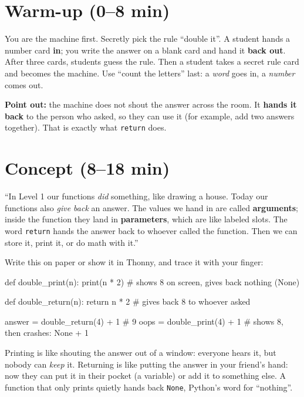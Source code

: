 \section{Warm-up (0--8 min)}
\begin{unplugged}
You are the machine first. Secretly pick the rule \enquote{double it}. A student hands a number card \textbf{in};
you write the answer on a blank card and hand it \textbf{back out}. After three cards, students guess the rule.
Then a student takes a secret rule card and becomes the machine. Use \enquote{count the letters} last: a \emph{word} goes in, a \emph{number} comes out.
\par\textbf{Point out:} the machine does not shout the answer across the room. It \textbf{hands it back} to the person who asked,
so they can use it (for example, add two answers together). That is exactly what \texttt{return} does.
\end{unplugged}

\section{Concept (8--18 min)}
\begin{teacherscript}[Say]
\enquote{In Level 1 our functions \emph{did} something, like drawing a house. Today our functions also \emph{give back} an answer.
The values we hand in are called \textbf{arguments}; inside the function they land in \textbf{parameters}, which are like labeled slots.
The word \texttt{return} hands the answer back to whoever called the function. Then we can store it, print it, or do math with it.}
\end{teacherscript}
Write this on paper or show it in Thonny, and trace it with your finger:
\begin{pycode}
def double_print(n):
    print(n * 2)          # shows 8 on screen, gives back nothing (None)

def double_return(n):
    return n * 2          # gives back 8 to whoever asked

answer = double_return(4) + 1   # 9
oops = double_print(4) + 1      # shows 8, then crashes: None + 1
\end{pycode}

\begin{analogy}
Printing is like shouting the answer out of a window: everyone hears it, but nobody can \emph{keep} it.
Returning is like putting the answer in your friend's hand: now they can put it in their pocket (a variable) or
add it to something else. A function that only prints quietly hands back \texttt{None}, Python's word for \enquote{nothing}.
\end{analogy}

